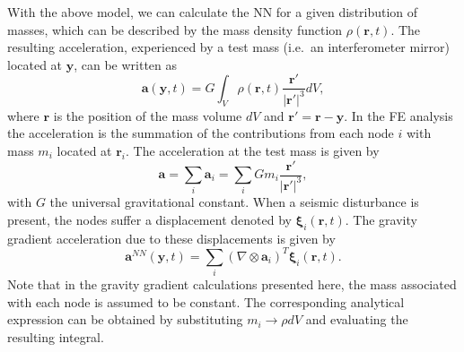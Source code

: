 With the above model, we can calculate the NN for a given distribution of masses, which can be described by the mass density function $\rho(\mathbf{r},t)$. The resulting acceleration, experienced by a test mass (i.e.\ an interferometer mirror) located at $\mathbf{y}$, can be written as
\begin{equation}
	\mathbf{a}(\mathbf{y},t) = G \int_V \rho(\mathbf{r},t) \frac{\mathbf{r'}}{|\mathbf{r'}|^3}dV,
	\label{eq3.42}
\end{equation}
where $\mathbf{r}$ is the position of the mass volume $dV$ and $\mathbf{r'}=\mathbf{r}-\mathbf{y}$. In the FE analysis the acceleration is the summation of the contributions from each node $i$ with mass $m_i$ located at $\mathbf{r}_i$. The acceleration at the test mass is given by
\begin{equation}
	\mathbf{a} = \sum_i \mathbf{a}_i = \sum_i  G m_i \frac{\mathbf{r'}}{|\mathbf{r'}|^3},
	\label{eq3.43}
\end{equation}
with $G$ the universal gravitational constant. When a seismic disturbance is present, the nodes suffer a displacement denoted by $\mathbf{\xi}_i(\mathbf{r},t)$. The gravity gradient acceleration due to these displacements is given by
\begin{equation}
	\mathbf{a}^{NN}(\mathbf{y},t) = \sum_i (\nabla\otimes\mathbf{a}_i)^T \mathbf{\xi}_i(\mathbf{r},t).
	\label{eq3.44}
\end{equation}
Note that in the gravity gradient calculations presented here, the mass associated with each node is assumed to be constant. The corresponding analytical expression can be obtained by substituting $m_i \rightarrow \rho dV$ and evaluating the resulting integral.


